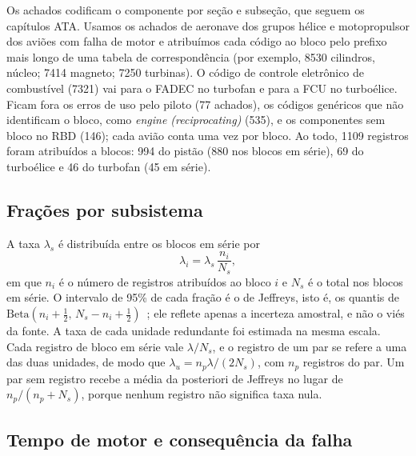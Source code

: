 Os achados codificam o componente por seção e subseção, que seguem os capítulos ATA.
Usamos os achados de aeronave dos grupos hélice e motopropulsor dos aviões com falha de motor e atribuímos cada código ao bloco pelo prefixo mais longo de uma tabela de correspondência (por exemplo, 8530 cilindros, núcleo; 7414 magneto; 7250 turbinas).
O código de controle eletrônico de combustível (7321) vai para o FADEC no turbofan e para a FCU no turboélice.
Ficam fora os erros de uso pelo piloto (77 achados), os códigos genéricos que não identificam o bloco, como \emph{engine (reciprocating)} (535), e os componentes sem bloco no RBD (146); cada avião conta uma vez por bloco.
Ao todo, 1109 registros foram atribuídos a blocos: 994 do pistão (880 nos blocos em série), 69 do turboélice e 46 do turbofan (45 em série).

\subsection{Frações por subsistema}\label{sec:fracoes}

A taxa $\lambda_s$ é distribuída entre os blocos em série por
\begin{equation}
  \lambda_i = \lambda_s \, \frac{n_i}{N_s},
  \label{eq:fracao}
\end{equation}
em que $n_i$ é o número de registros atribuídos ao bloco $i$ e $N_s$ é o total nos blocos em série.
O intervalo de 95\% de cada fração é o de Jeffreys, isto é, os quantis de $\mathrm{Beta}(n_i+\tfrac12,\,N_s-n_i+\tfrac12)$~\cite{brown2001}; ele reflete apenas a incerteza amostral, e não o viés da fonte.
A taxa de cada unidade redundante foi estimada na mesma escala.
Cada registro de bloco em série vale $\lambda/N_s$, e o registro de um par se refere a uma das duas unidades, de modo que $\lambda_u = n_p\lambda/(2N_s)$, com $n_p$ registros do par.
Um par sem registro recebe a média da posteriori de Jeffreys no lugar de $n_p/(n_p+N_s)$, porque nenhum registro não significa taxa nula.

\subsection{Tempo de motor e consequência da falha}\label{sec:tempo}

